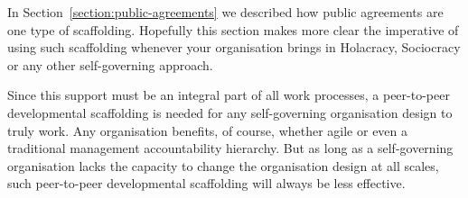 In Section~\ref{section:public-agreements} we described how public agreements are one type of scaffolding. Hopefully this section makes more clear the imperative of using such scaffolding whenever your organisation brings in Holacracy, Sociocracy or any other self-governing approach.


Since this support must be an integral part of all work processes, a peer-to-peer developmental scaffolding is needed for any self-governing organisation design to truly work. Any organisation benefits, of course, whether agile or even a traditional management accountability hierarchy. But as long as a self-governing organisation lacks the capacity to change the organisation design at all scales, such peer-to-peer developmental scaffolding will always be less effective.
